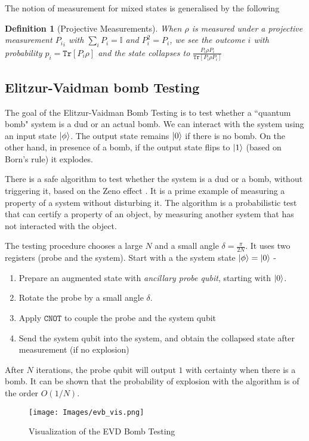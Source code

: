 \documentclass[]{article}
\newtheorem{definition}{Definition}
\newcommand*{\I}{\mathbb I}
\newcommand*{\Tr}{\texttt{Tr}}
\begin{document}
The notion of measurement for mixed states is generalised by the following
\begin{definition}[Projective Measurements]
    When $\rho$ is measured under a projective measurement ${P_i}_i$ with $\sum_i P_i = \I$ and $P^2_i = P_i$, we see the outcome $i$ with probability $p_i = \Tr[P_i\rho]$ and the state collapses to $\frac{P_i \rho P_i}{\Tr[P_i \rho P_i]}$ 
\end{definition}

\subsection{Elitzur-Vaidman bomb Testing}
The goal of the  Elitzur-Vaidman Bomb Testing is to test whether a ``quantum bomb" system is a dud or an actual bomb. We can interact with the system using an input state $\ket{\phi}$. The output state remains $\ket{0}$ if there is no bomb. On the other hand, in presence of a bomb, if the output state flips to $\ket{1}$ (based on Born's rule) it explodes.

There is a safe algorithm to test whether the system is a dud or a bomb, without triggering it, based on the Zeno effect \cite{lemeshko2009quantum}. It is a prime example of measuring a property of a system without disturbing it. The algorithm is a probabilistic test that can certify a property of an object, by measuring another system that has not interacted with the object.

The testing procedure chooses a large $N$ and a small angle $\delta = \frac{\pi}{2N}$. It uses two registers (probe and the system). Start with a the system state $\ket{\phi} = \ket{0}$ - 
\begin{enumerate}
    \item Prepare an augmented state with \textit{ancillary probe qubit}, starting with $\ket{0}$.
    \item Rotate the probe by a small angle $\delta$.
    \item Apply $\texttt{CNOT}$ to couple the probe and the system qubit
    \item Send the system qubit into the system, and obtain the collapsed state after measurement (if no explosion)
\end{enumerate}

After $N$ iterations, the probe qubit will output $1$ with certainty when there is a bomb. It can be shown that the probability of explosion with the algorithm is of the order $O(1/N)$.

\begin{figure}
    \centering
    \texttt{[image: Images/evb\_vis.png]}
    \caption{Visualization of the EVD Bomb Testing}
    \label{fig:evb_vis}
\end{figure}
\end{document}
